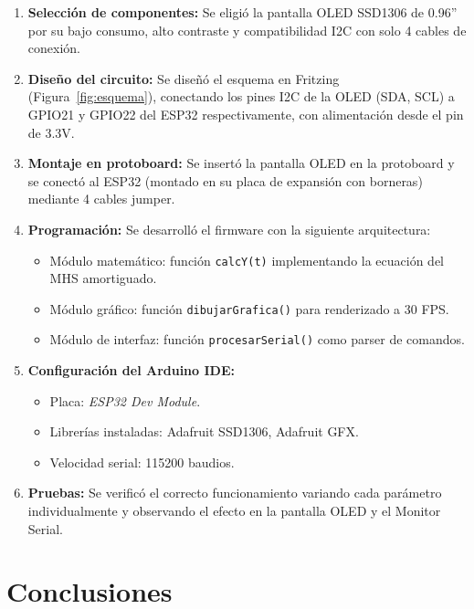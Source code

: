 \documentclass[12pt,a4paper]{article}
\begin{document}
\begin{enumerate}
    \item \textbf{Selección de componentes:} Se eligió la pantalla OLED SSD1306 de 0.96'' por su bajo consumo, alto contraste y compatibilidad I2C con solo 4 cables de conexión.

    \item \textbf{Diseño del circuito:} Se diseñó el esquema en Fritzing (Figura~\ref{fig:esquema}), conectando los pines I2C de la OLED (SDA, SCL) a GPIO21 y GPIO22 del ESP32 respectivamente, con alimentación desde el pin de 3.3V.

    \item \textbf{Montaje en protoboard:} Se insertó la pantalla OLED en la protoboard y se conectó al ESP32 (montado en su placa de expansión con borneras) mediante 4 cables jumper.

    \item \textbf{Programación:} Se desarrolló el firmware con la siguiente arquitectura:
    \begin{itemize}
        \item Módulo matemático: función \texttt{calcY(t)} implementando la ecuación del MHS amortiguado.
        \item Módulo gráfico: función \texttt{dibujarGrafica()} para renderizado a 30 FPS.
        \item Módulo de interfaz: función \texttt{procesarSerial()} como parser de comandos.
    \end{itemize}

    \item \textbf{Configuración del Arduino IDE:}
    \begin{itemize}
        \item Placa: \textit{ESP32 Dev Module}.
        \item Librerías instaladas: Adafruit SSD1306, Adafruit GFX.
        \item Velocidad serial: 115200 baudios.
    \end{itemize}

    \item \textbf{Pruebas:} Se verificó el correcto funcionamiento variando cada parámetro individualmente y observando el efecto en la pantalla OLED y el Monitor Serial.
\end{enumerate}

\section{Conclusiones}
\end{document}
